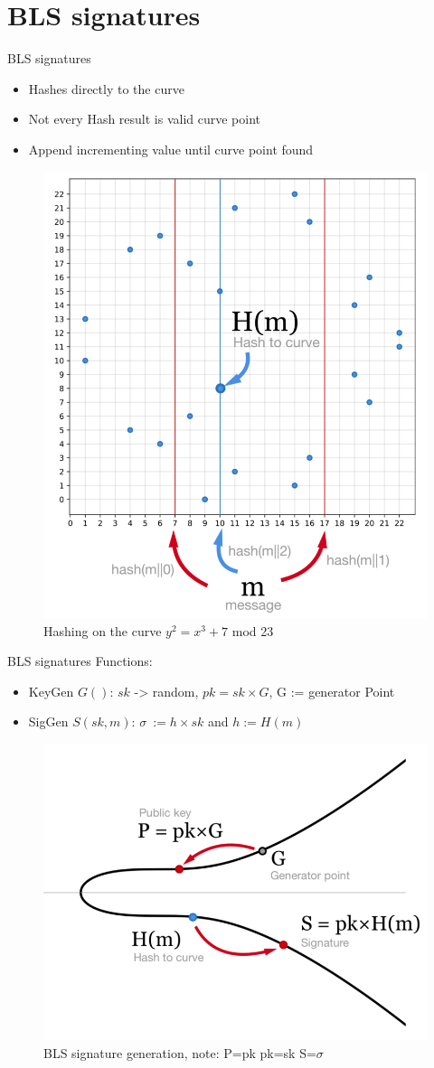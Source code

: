 \documentclass{beamer}
\begin{document}
\section{BLS signatures}
\begin{frame}{BLS signatures}
	\begin{itemize}
		\item Hashes directly to the curve
		\item Not every Hash result is valid curve point
		\item Append incrementing value until curve point found
	\end{itemize}
	\begin{figure}[hbt!]
		\centering
		\includegraphics[width=0.35\linewidth]{bls-hash}
		\caption{Hashing on the curve $y^2=x^3+7$ mod 23}
	\end{figure}
\end{frame}
\begin{frame}{BLS signatures}
	Functions:
	\begin{itemize}
		\item KeyGen $G()$: $sk$ -> random, $pk = sk \times{G}$, G := generator Point
		\item SigGen $S(sk, m)$: $\sigma\ := h\times{sk}$ and $h := H(m)$		
	\end{itemize}
	\begin{figure}[hbt!]
		\centering
		\includegraphics[width=0.4\linewidth]{bls-sign}
		\caption{BLS signature generation, note: P=pk pk=sk S=$\sigma$}
	\end{figure}
\end{frame}
\end{document}
